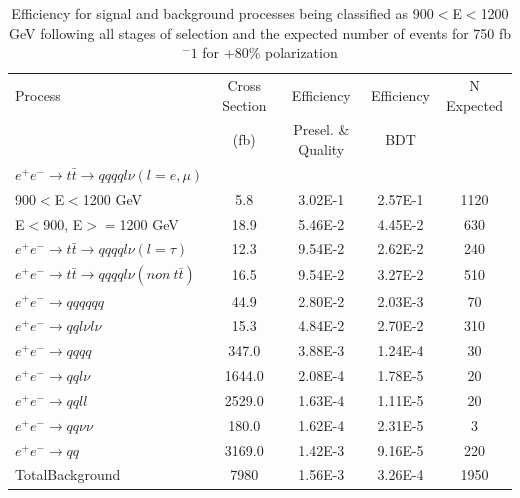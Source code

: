 \begin{table}
  \centering
  \begin{tabular}{l | c | c | c | c}
    \toprule
    Process     & Cross Section & Efficiency & Efficiency & N Expected\\
         & (fb) & Presel. \& Quality & BDT & \\
    \midrule
    $e^+e^-\rightarrow t\bar{t} \rightarrow qqqql\nu (l=e,\mu)$ &  & \\
    900$<$E$<$1200 GeV & 5.8 & 3.02E-1 & 2.57E-1 & 1120\\
    E$<$900, E$>=$1200 GeV & 18.9 & 5.46E-2& 4.45E-2& 630\\
   \midrule
    $e^+e^-\rightarrow t\bar{t} \rightarrow qqqql\nu (l=\tau)$& 12.3 & 9.54E-2 & 2.62E-2& 240\\
    \midrule
    $e^+e^-\rightarrow t\bar{t} \rightarrow qqqql\nu (non ~ t\bar{t})$& 16.5 & 9.54E-2 & 3.27E-2 & 510\\
    \midrule
    $e^+e^-\rightarrow qqqqqq$ & 44.9 & 2.80E-2 & 2.03E-3 & 70 \\
    \midrule
    $e^+e^-\rightarrow qql\nu l\nu$ & 15.3  & 4.84E-2 & 2.70E-2 & 310 \\
    \midrule
    $e^+e^-\rightarrow qqqq$ & 347.0 & 3.88E-3 & 1.24E-4 & 30 \\
    \midrule
    $e^+e^-\rightarrow qql\nu$ & 1644.0 & 2.08E-4& 1.78E-5 & 20\\
    \midrule
    $e^+e^-\rightarrow qqll$ & 2529.0 & 1.63E-4 & 1.11E-5 & 20 \\
    \midrule
    $e^+e^-\rightarrow qq\nu\nu$ & 180.0 & 1.62E-4 & 2.31E-5 & 3 \\
    \midrule
    $e^+e^-\rightarrow qq$ & 3169.0 & 1.42E-3 & 9.16E-5 & 220 \\
    \midrule
    \midrule
    TotalBackground & 7980 & 1.56E-3& 3.26E-4&  1950 \\
    \bottomrule
  \end{tabular}
  \caption{Efficiency for signal and background processes being classified as 900$<$E$<$1200 GeV following all stages of selection and the expected number of events for 750 fb$^-1$ for +80\% polarization}
  \label{table:topfinalefficienciesposMidE}
\end{table}


